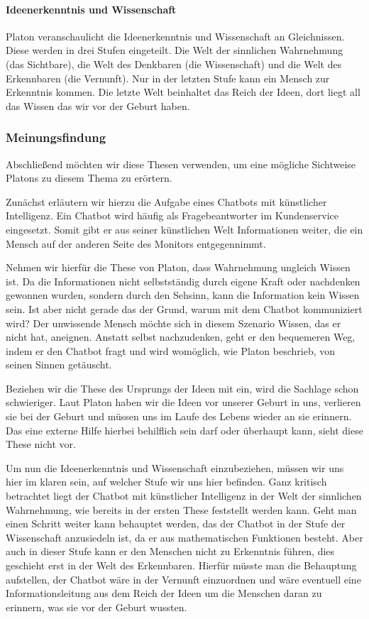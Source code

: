 \paragraph{Ideenerkenntnis und Wissenschaft}
Platon veranschaulicht die Ideenerkenntnis und Wissenschaft an Gleichnissen. Diese werden in drei Stufen eingeteilt. Die Welt der sinnlichen Wahrnehmung (das Sichtbare), die Welt des Denkbaren (die Wissenschaft) und die Welt des Erkennbaren (die Vernunft). Nur in der letzten Stufe kann ein Mensch zur Erkenntnis kommen. Die letzte Welt beinhaltet das Reich der Ideen, dort liegt all das Wissen das wir vor der Geburt haben.
	
\subsubsection{Meinungsfindung}
Abschließend möchten wir diese Thesen verwenden, um eine mögliche Sichtweise Platons zu diesem Thema zu erörtern.

Zunächst erläutern wir hierzu die Aufgabe eines Chatbots mit künstlicher Intelligenz. Ein Chatbot wird häufig als Fragebeantworter im Kundenservice eingesetzt. Somit gibt er aus seiner künstlichen Welt Informationen weiter, die ein Mensch auf der anderen Seite des Monitors entgegennimmt.

Nehmen wir hierfür die These von Platon, dass Wahrnehmung ungleich Wissen ist. Da die Informationen nicht selbstständig durch eigene Kraft oder  nachdenken gewonnen wurden, sondern durch den Sehsinn, kann die Information kein Wissen sein. Ist aber nicht gerade das der Grund, warum mit dem Chatbot kommuniziert wird? Der unwissende Mensch möchte sich in diesem Szenario Wissen, das er nicht hat, aneignen. Anstatt selbst nachzudenken, geht er den bequemeren Weg, indem er den Chatbot fragt und wird womöglich, wie Platon beschrieb, von seinen Sinnen getäuscht.

Beziehen wir die These des Ursprungs der Ideen mit ein, wird die Sachlage schon schwieriger. Laut Platon haben wir die Ideen vor unserer Geburt in uns, verlieren sie bei der Geburt und müssen uns im  Laufe des Lebens wieder an sie erinnern. Das eine externe Hilfe hierbei behilflich sein darf oder überhaupt kann, sieht diese These nicht vor.

Um nun die Ideenerkenntnis und Wissenschaft einzubeziehen, müssen wir uns hier im klaren sein, auf welcher Stufe wir uns hier befinden. Ganz kritisch betrachtet liegt der Chatbot mit künstlicher Intelligenz in der Welt der sinnlichen Wahrnehmung, wie bereits in der ersten These feststellt werden kann. Geht man einen Schritt weiter kann behauptet werden, das der Chatbot in der Stufe der Wissenschaft anzusiedeln ist, da er aus mathematischen Funktionen besteht. Aber auch in dieser Stufe kann er den Menschen nicht zu Erkenntnis führen, dies geschieht erst in der Welt des Erkennbaren. Hierfür müsste man die Behauptung aufstellen, der Chatbot wäre in der Vernunft einzuordnen und wäre eventuell eine Informationsleitung aus dem Reich der Ideen um die Menschen daran zu erinnern, was sie vor der Geburt wussten.

